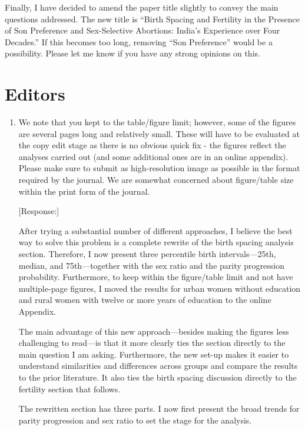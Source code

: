 \documentclass[letterpaper,12pt]{article}
\begin{document}
Finally, I have decided to amend the paper title slightly to convey the main questions 
addressed.
The new title is ``Birth Spacing and Fertility in the Presence of Son Preference and 
Sex-Selective Abortions: India's Experience over Four Decades.'' 
If this becomes too long, removing ``Son Preference'' would be a possibility.
Please let me know if you have any strong opinions on this.


\section*{Editors}

\begin{enumerate}

\item We note that you kept to the table/figure limit; however, some of
the figures are several pages long and relatively small. These will have
to be evaluated at the copy edit stage as there is no obvious quick fix
- the figures reflect the analyses carried out (and some additional ones
are in an online appendix). Please make sure to submit as
high-resolution image as possible in the format required by the journal.
We are somewhat concerned about figure/table size within the print form
of the journal.

[Response:]

After trying a substantial number of different approaches, I believe the best way to solve 
this problem is a complete rewrite of the birth spacing analysis section.
Therefore, I now present three percentile birth intervals---25th, median, and 75th---together
with the sex ratio and the parity progression probability.
Furthermore, to keep within the figure/table limit and not have multiple-page figures,
I moved the results for urban women without education and rural women with twelve or more 
years of education to the online Appendix.

The main advantage of this new approach---besides making the figures less challenging to 
read---is that it more clearly ties the section directly to the main question I am asking.
Furthermore, the new set-up makes it easier to understand similarities and differences 
across groups and compare the results to the prior literature.
It also ties the birth spacing discussion directly to the fertility section that follows.

The rewritten section has three parts.
I now first present the broad trends for parity progression and sex ratio to set the
stage for the analysis.


\end{enumerate}
\end{document}
